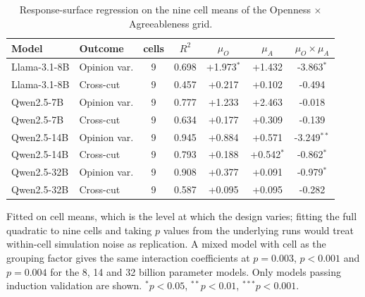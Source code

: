 \begin{table}[t]\centering
\scriptsize\setlength{\tabcolsep}{1.5pt}
\caption{Response-surface regression on the nine cell means of the Openness $\times$ Agreeableness grid.}
\label{tab:e3surface}
\begin{tabular}{@{}llccccc@{}}
\toprule
Model & Outcome & cells & $R^2$ & $\mu_O$ & $\mu_A$ & $\mu_O\!\times\!\mu_A$ \\
\midrule
Llama-3.1-8B & Opinion var. & 9 & 0.698 & +1.973$^{*}$ & +1.432 & -3.863$^{*}$ \\
Llama-3.1-8B & Cross-cut & 9 & 0.457 & +0.217 & +0.102 & -0.494 \\
Qwen2.5-7B & Opinion var. & 9 & 0.777 & +1.233 & +2.463 & -0.018 \\
Qwen2.5-7B & Cross-cut & 9 & 0.634 & +0.177 & +0.309 & -0.139 \\
Qwen2.5-14B & Opinion var. & 9 & 0.945 & +0.884 & +0.571 & -3.249$^{**}$ \\
Qwen2.5-14B & Cross-cut & 9 & 0.793 & +0.188 & +0.542$^{*}$ & -0.862$^{*}$ \\
Qwen2.5-32B & Opinion var. & 9 & 0.908 & +0.377 & +0.091 & -0.979$^{*}$ \\
Qwen2.5-32B & Cross-cut & 9 & 0.587 & +0.095 & +0.095 & -0.282 \\
\bottomrule
\end{tabular}
\par\smallskip\footnotesize Fitted on cell means, which is the level at which the design varies; fitting the full quadratic to nine cells and taking $p$ values from the underlying runs would treat within-cell simulation noise as replication. A mixed model with cell as the grouping factor gives the same interaction coefficients at $p = 0.003$, $p < 0.001$ and $p = 0.004$ for the 8, 14 and 32 billion parameter models. Only models passing induction validation are shown. $^{*}p<0.05$, $^{**}p<0.01$, $^{***}p<0.001$.
\end{table}
